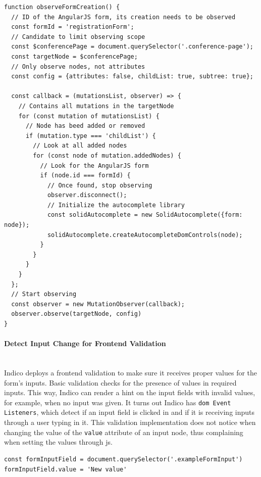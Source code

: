 \begin{lstlisting}[language=Other,columns=fullflexible, caption={Observe function in Indico}, label={lst:indico-observe}]
function observeFormCreation() {
  // ID of the AngularJS form, its creation needs to be observed
  const formId = 'registrationForm';
  // Candidate to limit observing scope
  const $conferencePage = document.querySelector('.conference-page');
  const targetNode = $conferencePage;
  // Only observe nodes, not attributes
  const config = {attributes: false, childList: true, subtree: true};

  const callback = (mutationsList, observer) => {
    // Contains all mutations in the targetNode
    for (const mutation of mutationsList) {
      // Node has beed added or removed
      if (mutation.type === 'childList') {
        // Look at all added nodes
        for (const node of mutation.addedNodes) {
          // Look for the AngularJS form
          if (node.id === formId) {
            // Once found, stop observing
            observer.disconnect();
            // Initialize the autocomplete library
            const solidAutocomplete = new SolidAutocomplete({form: node});
            solidAutocomplete.createAutocompleteDomControls(node);
          }
        }
      }
    }
  };
  // Start observing
  const observer = new MutationObserver(callback);
  observer.observe(targetNode, config)
}
\end{lstlisting}

\vspace{0.5cm}
\paragraph{Detect Input Change for Frontend Validation}\label{poc2-detect-input}\mbox{}\\

Indico deploys a frontend validation to make sure it receives proper values for the form's inputs. Basic validation checks for the presence of values in required inputs. This way, Indico can render a hint on the input fields with invalid values, for example, when no input was given. It turns out Indico has \texttt{\gls{dom} Event Listeners}, which detect if an input field is clicked in and if it is receiving inputs through a user typing in it. This validation implementation does not notice when changing the value of the \texttt{value} attribute of an input node, thus complaining when setting the values through \gls{js}.

\begin{lstlisting}[language=Other,columns=fullflexible, caption={Changing the value of an input node.}, label={lst:input-change}]
const formInputField = document.querySelector('.exampleFormInput')
formInputField.value = 'New value'
\end{lstlisting}


